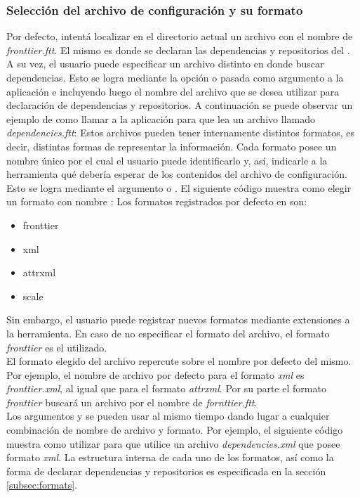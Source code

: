 \subsubsection{Selección del archivo de configuración y su formato}
\label{subsubsec:guide:confformat}

Por defecto, \fronttier intentá localizar en el directorio actual un archivo 
con el nombre de \emph{fronttier.ftt}. El mismo es donde se declaran las 
dependencias y repositorios del \project.\\
A su vez, el usuario puede especificar un archivo distinto en donde buscar 
dependencias. Esto se logra mediante la opción  o 
 pasada como argumento a la aplicación e incluyendo luego el nombre 
del archivo que se desea utilizar para declaración de dependencias y 
repositorios. A continuación se puede observar un ejemplo de como llamar a la 
aplicación para que lea un archivo llamado \emph{dependencies.ftt}:
Estos archivos pueden tener internamente distintos formatos, es decir, distintas
formas de representar la información. Cada formato posee un nombre único por el
cual el usuario puede identificarlo y, así, indicarle a la herramienta qué 
debería esperar de los contenidos del archivo de configuración. Esto se logra 
mediante el argumento  o . El siguiente código 
muestra como elegir un formato con nombre :
Los formatos registrados por defecto en \fronttier son:
\begin{itemize}
	\setlength{\itemsep}{1pt}
	\setlength{\parskip}{0pt}
	\setlength{\parsep}{0pt}
	\item fronttier
	\item xml
	\item attrxml
	\item scale
\end{itemize}
Sin embargo, el usuario puede registrar nuevos formatos mediante extensiones
a la herramienta. En caso de no especificar el formato del archivo, el formato 
\emph{fronttier} es el utilizado.\\
El formato elegido del archivo repercute sobre el nombre por defecto del
mismo. Por ejemplo, el nombre de archivo por defecto para el
formato \emph{xml} es \emph{fronttier.xml}, al igual que para el formato
\emph{attrxml}. Por su parte el formato \emph{fronttier} buscará
un archivo por el nombre de \emph{fornttier.ftt}.\\
Los argumentos  y  se pueden usar al mismo
tiempo dando lugar a cualquier combinación de nombre de archivo y formato.
Por ejemplo, el siguiente código muestra como utilizar \fronttier para que 
utilice un archivo \emph{dependencies.xml} que posee formato \emph{xml}.
La estructura interna de cada uno de los formatos, así como la forma de 
declarar dependencias y repositorios es especificada en la sección 
\ref{subsec:formats}.

